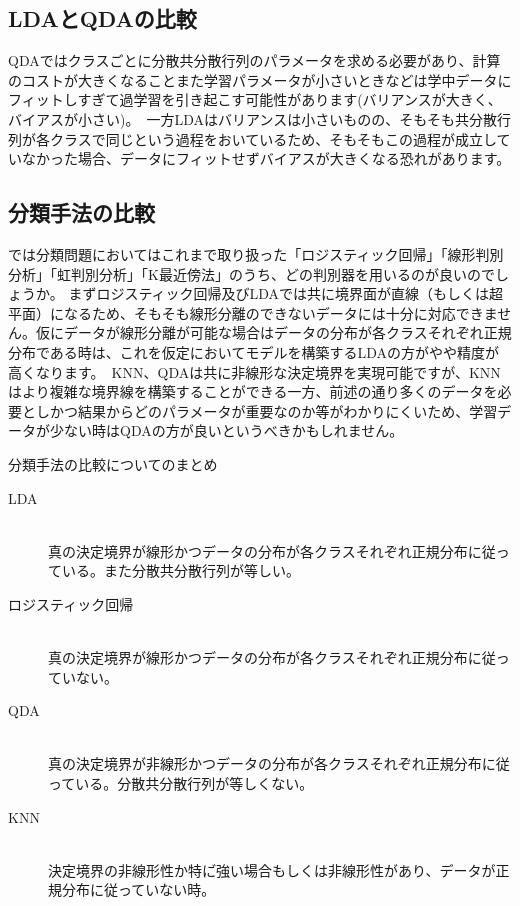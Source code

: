 \documentclass[uplatex]{jsarticle}
\begin{document}
\subsection{LDAとQDAの比較}
QDAではクラスごとに分散共分散行列のパラメータを求める必要があり、計算のコストが大きくなることまた学習パラメータが小さいときなどは学中データにフィットしすぎて過学習を引き起こす可能性があります(バリアンスが大きく、バイアスが小さい)。\
一方LDAはバリアンスは小さいものの、そもそも共分散行列が各クラスで同じという過程をおいているため、そもそもこの過程が成立していなかった場合、データにフィットせずバイアスが大きくなる恐れがあります。

\subsection{分類手法の比較}
では分類問題においてはこれまで取り扱った「ロジスティック回帰」「線形判別分析」「虹判別分析」「K最近傍法」のうち、どの判別器を用いるのが良いのでしょうか。
まずロジスティック回帰及びLDAでは共に境界面が直線（もしくは超平面）になるため、そもそも線形分離のできないデータには十分に対応できません。仮にデータが線形分離が可能な場合はデータの分布が各クラスそれぞれ正規分布である時は、これを仮定においてモデルを構築するLDAの方がやや精度が高くなります。\
KNN、QDAは共に非線形な決定境界を実現可能ですが、KNNはより複雑な境界線を構築することができる一方、前述の通り多くのデータを必要としかつ結果からどのパラメータが重要なのか等がわかりにくいため、学習データが少ない時はQDAの方が良いというべきかもしれません。
\begin{itembox}[l]{分類手法の比較についてのまとめ}
  \begin{description}
    \item [LDA]\mbox{}\\
    真の決定境界が線形かつデータの分布が各クラスそれぞれ正規分布に従っている。また分散共分散行列が等しい。
    \item [ロジスティック回帰]\mbox{}\\
    真の決定境界が線形かつデータの分布が各クラスそれぞれ正規分布に従っていない。
    \item [QDA]\mbox{}\\
    真の決定境界が非線形かつデータの分布が各クラスそれぞれ正規分布に従っている。分散共分散行列が等しくない。
    \item [KNN]\mbox{}\\
    決定境界の非線形性か特に゙強い場合もしくは非線形性があり、データが正規分布に従っていない時。
  \end{description}

\end{itembox}
\end{document}
